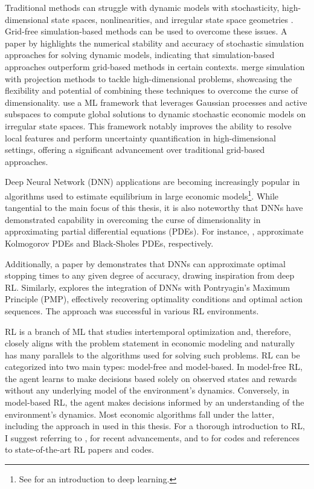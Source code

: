 Traditional methods can struggle with dynamic models with stochasticity, high-dimensional state spaces, nonlinearities, and irregular state space geometries \parencite{Azinovic2022DEQN}. Grid-free simulation-based methods can be used to overcome these issues. A paper by \textcite{JuddMailar2011} highlights the numerical stability and accuracy of stochastic simulation approaches for solving dynamic models, indicating that simulation-based approaches outperform grid-based methods in certain contexts. \textcite{MaliarMailar2015} merge simulation with projection methods to tackle high-dimensional problems, showcasing the flexibility and potential of combining these techniques to overcome the curse of dimensionality. \textcite{ScheideggerBilionis2019} use a ML framework that leverages Gaussian processes and active subspaces to compute global solutions to dynamic stochastic economic models on irregular state spaces. This framework notably improves the ability to resolve local features and perform uncertainty quantification in high-dimensional settings, offering a significant advancement over traditional grid-based approaches.

Deep Neural Network (DNN) applications are becoming increasingly popular in algorithms used to estimate equilibrium in large economic models\footnote{See \textcite{Goodfellow2016} for an introduction to deep learning.}. While tangential to the main focus of this thesis, it is also noteworthy that DNNs have demonstrated capability in overcoming the curse of dimensionality in approximating partial differential equations (PDEs). For instance, \textcite{Jentzen2019diffs, Grohs2023diffs}, approximate Kolmogorov PDEs and Black-Sholes PDEs, respectively. 

Additionally, a paper by \textcite{becker2020deep} demonstrates that DNNs can approximate optimal stopping times to any given degree of accuracy, drawing inspiration from deep RL. Similarly, \textcite{gu2024pontryagin} explores the integration of DNNs with Pontryagin's Maximum Principle (PMP), effectively recovering optimality conditions and optimal action sequences. The approach was successful in various RL environments.

RL is a branch of ML that studies intertemporal optimization and, therefore, closely aligns with the problem statement in economic modeling and naturally has many parallels to the algorithms used for solving such problems. RL can be categorized into two main types: model-free and model-based. In model-free RL, the agent learns to make decisions based solely on observed states and rewards without any underlying model of the environment's dynamics. Conversely, in model-based RL, the agent makes decisions informed by an understanding of the environment's dynamics. Most economic algorithms fall under the latter, including the approach in \textcite{Azinovic2022DEQN} used in this thesis. For a thorough introduction to RL, I suggest referring to \textcite{Sutton2018intro_to_rl}, \textcite{Shakya2023} for recent advancements, and to \textcite{SpinningUp2018} for codes and references to state-of-the-art RL papers and codes. 

